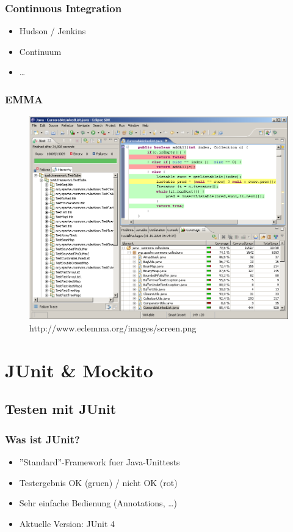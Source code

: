 \documentclass{beamer}
\begin{document}
			\begin{frame}
				\frametitle{Continuous Integration}

				\begin{itemize}
					\item{Hudson / Jenkins}
					\item{Continuum}
					\item{\ldots}
				\end{itemize}
			\end{frame}

			\begin{frame}
				\frametitle{EMMA}

				\begin{figure}[htb]
					\begin{center}
						\includegraphics[scale=0.25]{eclemma}
					\end{center}
					\caption{http://www.eclemma.org/images/screen.png}
				\end{figure}
			\end{frame}

	
	\section{JUnit \& Mockito}

		\subsection{Testen mit JUnit}

			\begin{frame}
				\frametitle{Was ist JUnit?}

				\begin{itemize}
					\item{''Standard''-Framework fuer Java-Unittests}
					\item{Testergebnis OK (gruen) / nicht OK (rot)}
					\item{Sehr einfache Bedienung (Annotations, \ldots)}
					\item{Aktuelle Version: JUnit 4}
				\end{itemize}
			\end{frame}
\end{document}

